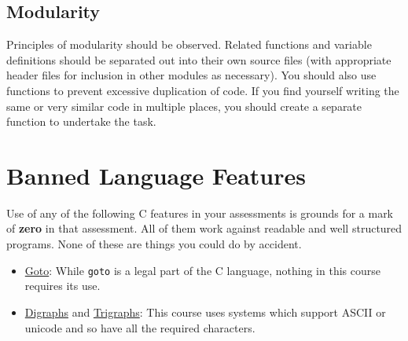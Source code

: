 \documentclass{article}
\begin{document}
\subsection{Modularity}
Principles of modularity should be observed.
Related functions and variable definitions should be separated out into their own source files (with appropriate header files for inclusion in other modules as necessary).
You should also use functions to prevent excessive duplication of code.
If you find yourself writing the same or very similar code in multiple places, you should create a separate function to undertake the task.

\section{Banned Language Features}
Use of any of the following C features in your assessments is grounds for a mark of \textbf{zero} in that assessment.
All of them work against readable and well structured programs.
None of these are things you could do by accident.

\begin{itemize}
\item \underline{Goto}: While \texttt{goto} is a legal part of the C language, nothing in this course requires its use.
\item \underline{Digraphs} and \underline{Trigraphs}: This course uses systems which support ASCII or unicode and so have all the required characters.
\end{itemize}
\end{document}
